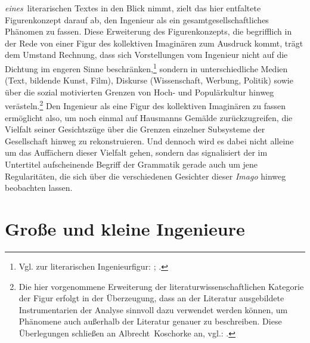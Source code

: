 \documentclass[%
	fontsize=10pt,%
	twoside,%
	headings=optiontoheadandtoc,%
	showtrims]{scrbook}
\newcommand{\antiqua}[3]{%
	\fontsize{#1}{#2}%
	\Lyon%
	\addfontfeature{LetterSpace=#3}%
	\selectfont%
}
\newcommand{\regularfontantiqua}{%
	\normalfont%
	\antiqua{9.3bp}{12bp}{.05}%
}
\newcommand{\regularfontdefault}{%
	\regularfontantiqua%
}
\renewcommand{\texttt}{\nohyphens} %
\begin{document}
\emph{\texttt{eines}}\texttt{~lite\-ra\-rischen} Textes in den Blick nimmt, zielt das hier entfaltete Fi\-gurenkonzept darauf ab, den Ingenieur als ein gesamtgesell\-schaftliches Phänomen zu fassen. Diese Erweiterung des Fi\-gurenkonzepts, die begrifflich in der Rede von einer Figur des kollektiven Imaginären zum Ausdruck kommt, trägt dem Umstand Rechnung, dass sich Vorstellungen vom Ingenieur nicht auf die Dichtung im engeren Sinne beschränken,\footnote{Vgl. zur literarischen Ingenieurfigur: \cite[][]{schwiglewski1995a}; \cite[][]{brandt2007a}.}  sondern in unterschiedliche Medien (Text, bildende Kunst, Film), Diskurse (Wissenschaft, Werbung, Politik) sowie über die sozial motivierten Grenzen von Hoch- und Populärkultur hinweg verästeln.\footnote{Die hier vorgenommene Erweiterung der literaturwissenschaftlichen Kategorie der Figur erfolgt in der Überzeugung, dass an der Literatur ausgebildete Instrumentarien der Analyse sinnvoll dazu verwendet werden können, um Phänomene auch außerhalb der Literatur genauer zu beschreiben. Diese Überlegungen schließen an \texttt{Albrecht~Koschorke} an, vgl.: \cite[][]{koschorke2007a}.}  Den Ingenieur als eine Figur des kollektiven Imaginären zu fassen ermöglicht also, um noch einmal auf Hausmanns Gemälde zurückzugreifen, die Vielfalt seiner Gesichtszüge über die Grenzen einzelner Subsysteme der Gesellschaft hinweg zu rekonstruieren. Und dennoch wird es dabei nicht alleine um das Auffächern dieser Vielfalt gehen, sondern \textendash{} das signalisiert der im Untertitel aufscheinende Begriff der Grammatik \textendash{} gerade auch um jene Regularitäten, die sich über die verschiedenen Gesichter dieser \emph{Imago} hinweg beobachten lassen.%
%
					
						\chapter[head={Große und kleine Ingenieure}, tocentry={GROẞE UND KLEINE INGENIEURE}]{Große und kleine Ingenieure}%
					
					\-
					\par			
					\newpage%
					\noindent%
					\regularfontdefault%
	
\end{document}
